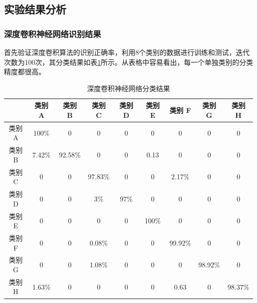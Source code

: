 \subsection{实验结果分析}

\subsubsection{深度卷积神经网络识别结果}

首先验证深度卷积算法的识别正确率，利用8个类别的数据进行训练和测试，迭代次数为100次，其分类结果如表\ref{tab:cnn_29}所示。从表格中容易看出，每一个单独类别的分类精度都很高。
\begin{table}[hbt]
	\renewcommand{\arraystretch}{1.3}
	\caption{深度卷积神经网络分类结果}
	\label{tab:cnn_29}
	\centering\sWuhao
	\begin{tabular}{ccccccccc}
		\toprule
		 & 类别 A & 类别 B & 类别 C & 类别 D & 类别 E & 类别 F & 类别 G & 类别 H \\
		 \midrule
		 类别 A & 100\% & 0 & 0 & 0 & 0 & 0 & 0 & 0 \\
		 类别 B & 7.42\% & 92.58\% & 0 & 0 & 0.13 & 0 & 0 & 0 \\
		 类别 C & 0 & 0 & 97.83\% & 0 & 0 & 2.17\% & 0 & 0 \\
		 类别 D & 0 & 0 & 3\% & 97\% & 0 & 0 & 0 & 0 \\
		 类别 E & 0 & 0 & 0 & 0 & 100\% & 0 & 0 & 0 \\
		 类别 F & 0 & 0 & 0.08\% & 0 & 0 & 99.92\% & 0 & 0 \\
		 类别 G & 0 & 0 & 1.08\% & 0 & 0 & 0 & 98.92\% & 0 \\
		 类别 H & 1.63\% & 0 & 0 & 0 & 0 & 0.63 & 0 & 98.37\% \\
		\bottomrule
	\end{tabular}
\end{table}

